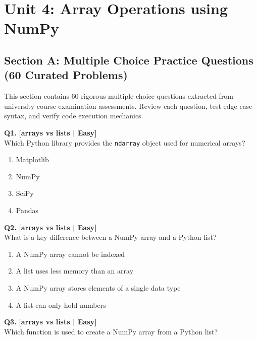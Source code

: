 \chapter{Unit 4: Array Operations using NumPy}

\section{Section A: Multiple Choice Practice Questions (60 Curated Problems)}

\noindent This section contains 60 rigorous multiple-choice questions extracted from university course examination assessments. Review each question, test edge-case syntax, and verify code execution mechanics.
\vspace{3mm}

\noindent\textbf{Q1.} \hfill {\small\color{LPUOrange}\textbf{[arrays vs lists | Easy]}}\\[2pt]
Which Python library provides the \texttt{ndarray} object used for numerical arrays?

\begin{enumerate}[label=(\alph*),topsep=2pt,itemsep=1pt,partopsep=0pt,parsep=0pt]
    \item \relax Matplotlib
    \item \relax NumPy
    \item \relax SciPy
    \item \relax Pandas
\end{enumerate}
\vspace{2mm}

\noindent\textbf{Q2.} \hfill {\small\color{LPUOrange}\textbf{[arrays vs lists | Easy]}}\\[2pt]
What is a key difference between a NumPy array and a Python list?

\begin{enumerate}[label=(\alph*),topsep=2pt,itemsep=1pt,partopsep=0pt,parsep=0pt]
    \item \relax A NumPy array cannot be indexed
    \item \relax A list uses less memory than an array
    \item \relax A NumPy array stores elements of a single data type
    \item \relax A list can only hold numbers
\end{enumerate}
\vspace{2mm}

\noindent\textbf{Q3.} \hfill {\small\color{LPUOrange}\textbf{[arrays vs lists | Easy]}}\\[2pt]
Which function is used to create a NumPy array from a Python list?

